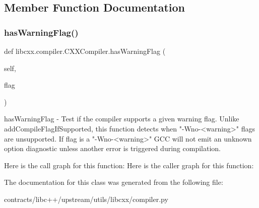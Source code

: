 \subsection{Member Function Documentation}
\mbox{\label{classlibcxx_1_1compiler_1_1_c_x_x_compiler_a6ebec3239cbae932839399bca06ac495}} 
\subsubsection{\texorpdfstring{has\+Warning\+Flag()}{hasWarningFlag()}}
{\footnotesize\ttfamily def libcxx.\+compiler.\+C\+X\+X\+Compiler.\+has\+Warning\+Flag (\begin{DoxyParamCaption}\item[{}]{self,  }\item[{}]{flag }\end{DoxyParamCaption})}

\begin{DoxyVerb}hasWarningFlag - Test if the compiler supports a given warning flag.
Unlike addCompileFlagIfSupported, this function detects when
"-Wno-<warning>" flags are unsupported. If flag is a
"-Wno-<warning>" GCC will not emit an unknown option diagnostic unless
another error is triggered during compilation.
\end{DoxyVerb}
 Here is the call graph for this function\+:
Here is the caller graph for this function\+:


The documentation for this class was generated from the following file\+:\begin{DoxyCompactItemize}
\item 
contracts/libc++/upstream/utils/libcxx/compiler.\+py\end{DoxyCompactItemize}
